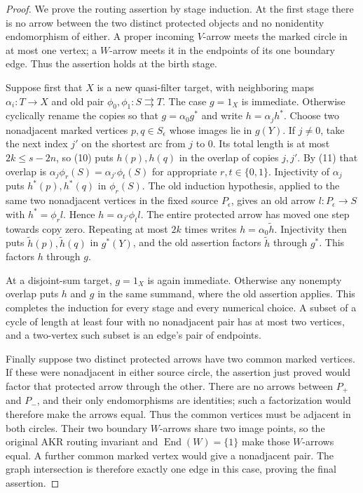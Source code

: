 \begin{proof}
We prove the routing assertion by stage induction. At the first stage
there is no arrow between the two distinct protected objects and no
nonidentity endomorphism of either. A proper incoming $V$-arrow meets
the marked circle in at most one vertex; a $W$-arrow meets it in the
endpoints of its one boundary edge. Thus the assertion holds at the
birth stage.

Suppose first that $X$ is a new quasi-filter target, with neighboring
maps $\alpha_i:T\to X$ and old pair $\phi_0,\phi_1:S\rightrightarrows
T$. The case $g=1_X$ is immediate. Otherwise cyclically rename the
copies so that $g=\alpha_0g^*$ and write $h=\alpha_jh^*$. Choose two
nonadjacent marked vertices $p,q\in S_\epsilon$ whose images lie in
$g(Y)$. If $j\ne0$, take the next index $j'$ on the shortest arc from
$j$ to $0$. Its total length is at most $2k\leq s-2n$, so (10) puts
$h(p),h(q)$ in the overlap of copies $j,j'$. By (11) that overlap is
$\alpha_j\phi_r(S)=\alpha_{j'}\phi_t(S)$ for appropriate
$r,t\in\{0,1\}$. Injectivity of $\alpha_j$ puts $h^*(p),h^*(q)$ in
$\phi_r(S)$. The old induction hypothesis, applied to the same two
nonadjacent vertices in the fixed source $P_\epsilon$, gives an old
arrow $l:P_\epsilon\to S$ with $h^*=\phi_r l$. Hence
$h=\alpha_{j'}\phi_t l$. The entire protected arrow has moved one
step towards copy zero. Repeating at most $2k$ times writes
$h=\alpha_0\widetilde h$. Injectivity then puts
$\widetilde h(p),\widetilde h(q)$ in $g^*(Y)$, and the old assertion
factors $\widetilde h$ through $g^*$. This factors $h$ through $g$.

At a disjoint-sum target, $g=1_X$ is again immediate. Otherwise any
nonempty overlap puts $h$ and $g$ in the same summand, where the old
assertion applies. This completes the induction for every stage and
every numerical choice. A subset of a cycle of length at least four
with no nonadjacent pair has at most two vertices, and a two-vertex
such subset is an edge's pair of endpoints.

Finally suppose two distinct protected arrows have two common marked
vertices. If these were nonadjacent in either source circle, the
assertion just proved would factor that protected arrow through the
other. There are no arrows between $P_+$ and $P_-$, and their only
endomorphisms are identities; such a factorization would therefore
make the arrows equal. Thus the common vertices must be adjacent in
both circles. Their two boundary $W$-arrows share two image points, so
the original AKR routing invariant and $\operatorname{End}(W)=\{1\}$
make those $W$-arrows equal. A further common marked vertex would
give a nonadjacent pair. The graph intersection is therefore exactly
one edge in this case, proving the final assertion.
\end{proof}

